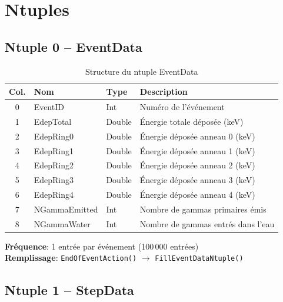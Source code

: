 \documentclass[11pt,a4paper]{article}
\begin{document}
\section{Ntuples}

\subsection{Ntuple 0 -- EventData}

\begin{table}[h]
\centering
\begin{tabular}{clll}
\toprule
\rowcolor{headerblue!20}
\textbf{Col.} & \textbf{Nom} & \textbf{Type} & \textbf{Description} \\
\midrule
0 & EventID & Int & Numéro de l'événement \\
\rowcolor{lightgray}
1 & EdepTotal & Double & Énergie totale déposée (keV) \\
2 & EdepRing0 & Double & Énergie déposée anneau 0 (keV) \\
\rowcolor{lightgray}
3 & EdepRing1 & Double & Énergie déposée anneau 1 (keV) \\
4 & EdepRing2 & Double & Énergie déposée anneau 2 (keV) \\
\rowcolor{lightgray}
5 & EdepRing3 & Double & Énergie déposée anneau 3 (keV) \\
6 & EdepRing4 & Double & Énergie déposée anneau 4 (keV) \\
\rowcolor{lightgray}
7 & NGammaEmitted & Int & Nombre de gammas primaires émis \\
8 & NGammaWater & Int & Nombre de gammas entrés dans l'eau \\
\bottomrule
\end{tabular}
\caption{Structure du ntuple EventData}
\end{table}

\textbf{Fréquence}: 1 entrée par événement (100\,000 entrées)\\
\textbf{Remplissage}: \texttt{EndOfEventAction()} $\rightarrow$ \texttt{FillEventDataNtuple()}

\subsection{Ntuple 1 -- StepData}
\end{document}
